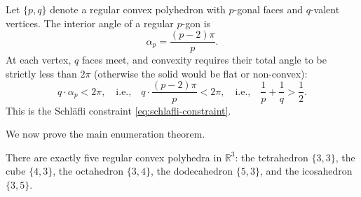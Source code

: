 Let $\{p,q\}$ denote a regular convex polyhedron with $p$-gonal faces and
$q$-valent vertices.  The interior angle of a regular $p$-gon is
\[
  \alpha_p = \frac{(p-2)\pi}{p}.
\]
At each vertex, $q$ faces meet, and convexity requires their total angle to be
strictly less than $2\pi$ (otherwise the solid would be flat or
non-convex):
\[
  q \cdot \alpha_p < 2\pi,
  \quad\text{i.e.,}\quad
  q \cdot \frac{(p-2)\pi}{p} < 2\pi,
  \quad\text{i.e.,}\quad
  \frac{1}{p} + \frac{1}{q} > \frac{1}{2}.
\]
This is the Schläfli constraint \eqref{eq:schlafli-constraint}.

We now prove the main enumeration theorem.


\begin{theorem}
\label{thm:platonic-enumeration}
There are exactly five regular convex polyhedra in $\mathbb{R}^{3}$:
the tetrahedron $\{3,3\}$, the cube $\{4,3\}$, the octahedron $\{3,4\}$,
the dodecahedron $\{5,3\}$, and the icosahedron $\{3,5\}$.
\end{theorem}

